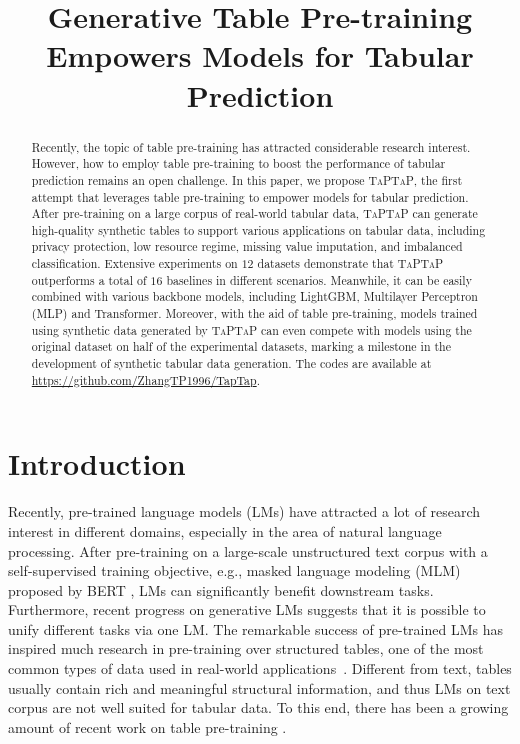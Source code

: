 \title{Generative Table Pre-training Empowers Models for Tabular Prediction}

\begin{abstract}
Recently, the topic of table pre-training has attracted considerable research interest. However, how to employ table pre-training to boost the performance of tabular prediction remains an open challenge. In this paper, we propose \textsc{TaPTaP}, the first attempt that leverages table pre-training to empower models for tabular prediction. After pre-training on a large corpus of real-world tabular data, \textsc{TaPTaP} can generate high-quality synthetic tables to support various applications on tabular data, including privacy protection, low resource regime, missing value imputation, and imbalanced classification. Extensive experiments on $12$ datasets demonstrate that \textsc{TaPTaP} outperforms a total of $16$ baselines in different scenarios. Meanwhile, it can be easily combined with various backbone models, including LightGBM, Multilayer Perceptron (MLP) and Transformer. Moreover, with the aid of table pre-training, models trained using synthetic data generated by \textsc{TaPTaP} can even compete with models using the original dataset on half of the experimental datasets, marking a milestone in the development of synthetic tabular data generation. The codes are available at \url{https://github.com/ZhangTP1996/TapTap}.
\end{abstract}

\section{Introduction}

Recently, pre-trained language models (LMs) have attracted a lot of research interest in different domains, especially in the area of natural language processing. After pre-training on a large-scale unstructured text corpus with a self-supervised training objective, e.g., masked language modeling (MLM) proposed by BERT \citep{devlin-etal-2019-bert}, LMs can significantly benefit downstream tasks. Furthermore, recent progress on generative LMs \citep{GPT2,T5,lewis-etal-2020-bart} suggests that it is possible to unify different tasks via one LM. The remarkable success of pre-trained LMs has inspired much research in pre-training over structured tables, one of the most common types of data used in real-world applications~\citep{DBLP:conf/semweb/BenjellounCN20}. Different from text, tables usually contain rich and meaningful structural information, and thus LMs on text corpus are not well suited for tabular data. To this end, there has been a growing amount of recent work on table pre-training \citep{herzig-etal-2020-tapas,yin-etal-2020-tabert,tuta,liu2022tapex}.

